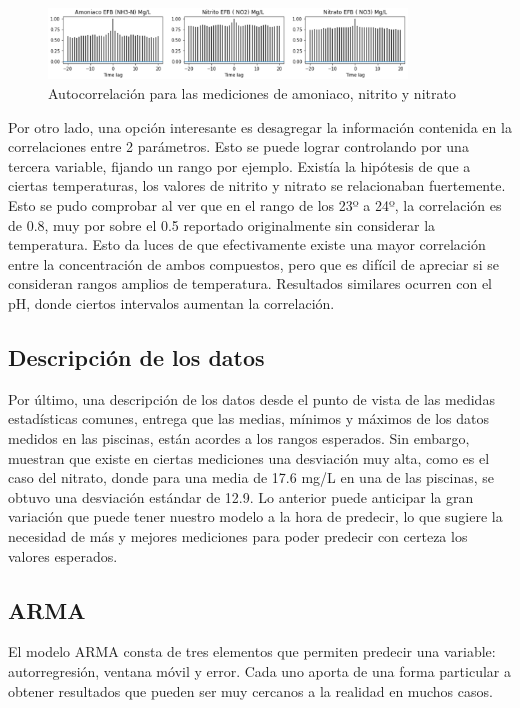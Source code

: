 \documentclass[letterpaper, 12pt]{article}
\begin{document}
\begin{figure}[H]
  \centering
    \includegraphics[width=0.85\textwidth]{img/autocorr.png}
  \caption{Autocorrelación para las mediciones de amoniaco, nitrito y nitrato}
  \label{fig:autocorr}
\end{figure}

Por otro lado, una opción interesante es desagregar la información contenida en la correlaciones entre 2 parámetros. Esto se puede lograr controlando por una tercera variable, fijando un rango por ejemplo. Existía la hipótesis de que a ciertas temperaturas, los valores de nitrito y nitrato se relacionaban fuertemente. Esto se pudo comprobar al ver que en el rango de los 23º a 24º, la correlación es de 0.8, muy por sobre el 0.5 reportado originalmente sin considerar la temperatura. Esto da luces de que efectivamente existe una mayor correlación entre la concentración de ambos compuestos, pero que es difícil de apreciar si se consideran rangos amplios de temperatura. Resultados similares ocurren con el pH, donde ciertos intervalos aumentan la correlación.

\subsection{Descripción de los datos}

Por último, una descripción de los datos desde el punto de vista de las medidas estadísticas comunes, entrega que las medias, mínimos y máximos de los datos medidos en las piscinas, están acordes a los rangos esperados. Sin embargo, muestran que existe en ciertas mediciones una desviación muy alta, como es el caso del nitrato, donde para una media de 17.6 mg/L en una de las piscinas, se obtuvo una desviación estándar de 12.9. Lo anterior puede anticipar la gran variación que puede tener nuestro modelo a la hora de predecir, lo que sugiere la necesidad de más y mejores mediciones para poder predecir con certeza los valores esperados.

\subsection{ARMA}

El modelo ARMA consta de tres elementos que permiten predecir una variable: autorregresión, ventana móvil y error. Cada uno aporta de una forma particular a obtener resultados que pueden ser muy cercanos a la realidad en muchos casos.\\
\end{document}
